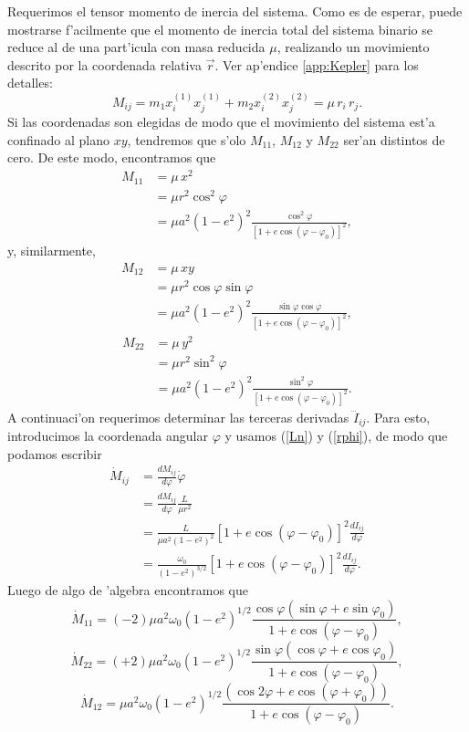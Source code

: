 Requerimos el tensor momento de inercia del sistema. Como es de esperar, puede mostrarse f'acilmente que el momento de inercia total del sistema binario se reduce al de una part'icula con masa reducida $\mu$, realizando un movimiento descrito por la coordenada relativa $\vec{r}$. Ver ap'endice \ref{app:Kepler} para los detalles:
\begin{equation}
M_{ij}=m_1x_i^{(1)}x_j^{(1)}+m_2x_i^{(2)}x_j^{(2)}=\mu\, r_i\,r_j.
\end{equation}
Si las coordenadas son elegidas de modo que el movimiento del sistema est'a confinado al plano $xy$, tendremos que s'olo $M_{11}$, $M_{12}$ y $M_{22}$ ser'an distintos de cero. De este modo, encontramos que
\begin{align}
M_{11} & = \mu\, x^2\\
& = \mu r^2\cos^2\varphi \\
& = \mu a^2(1-e^2)^2\frac{\cos^2\varphi}{\left[1+e\cos(\varphi-\varphi_0)\right]^2},
\end{align}
y, similarmente,
\begin{align}
M_{12} & = \mu\, xy \\
& = \mu r^2\cos\varphi\sin\varphi \\
& = \mu a^2(1-e^2)^2\frac{\sin\varphi\cos\varphi}{\left[1+e\cos(\varphi-\varphi_0)\right]^2},
\end{align}
\begin{align}
M_{22} & = \mu\, y^2 \\
& = \mu r^2\sin^2\varphi \\
& = \mu a^2(1-e^2)^2\frac{\sin^2\varphi}{\left[1+e\cos(\varphi-\varphi_0)\right]^2}.
\end{align}
A continuaci'on requerimos determinar las terceras derivadas $\dddot{I}_{ij}$. Para esto, introducimos la coordenada angular $\varphi$ y usamos (\ref{Ln}) y (\ref{rphi}), de modo que podamos escribir
\begin{align}
\dot{M}_{ij} &= \frac{dM_{ij}}{d\varphi}\dot{\varphi} \\
&= \frac{dM_{ij}}{d\varphi}\frac{L}{\mu r^2} \\
&= \frac{L}{\mu a^2(1-e^2)^2}\left[1+e\cos(\varphi-\varphi_0)\right]^2 \frac{dI_{ij}}{d\varphi}\\
&= \frac{\omega_0}{(1-e^2)^{3/2}}\left[1+e\cos(\varphi-\varphi_0)\right]^2 \frac{dI_{ij}}{d\varphi}.
\end{align}
Luego de algo de 'algebra encontramos que
\begin{equation}
\dot{M}_{11}=(-2)\mu a^2\omega_0\left(1-e^2\right)^{1/2}\frac{\cos\varphi(\sin\varphi+e\sin\varphi_0)}{1+e\cos(\varphi-\varphi_0)},
\end{equation}
\begin{equation}
\dot{M}_{22}=(+2)\mu a^2\omega_0\left(1-e^2\right)^{1/2}\frac{\sin\varphi(\cos\varphi+e\cos\varphi_0)}{1+e\cos(\varphi-\varphi_0)},
\end{equation}
\begin{equation}
\dot{M}_{12}=\mu a^2\omega_0\left(1-e^2\right)^{1/2}\frac{(\cos2\varphi+e\cos(\varphi+\varphi_0))}{1+e\cos(\varphi-\varphi_0)}.
\end{equation}

